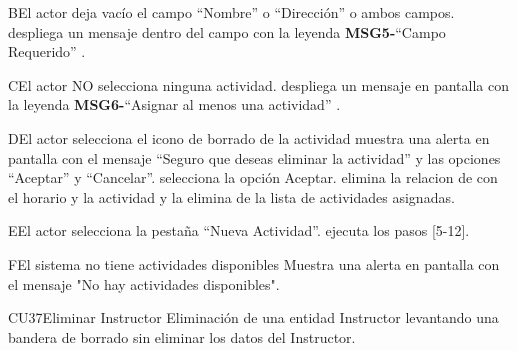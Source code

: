 		\begin{UCtrayectoriaA}{B}{El actor deja vacío el campo “Nombre” o “Dirección” o ambos campos.}
			\UCpaso despliega un mensaje dentro del campo con la leyenda {\bf MSG5-}``Campo Requerido'' .
		\end{UCtrayectoriaA}
		\begin{UCtrayectoriaA}{C}{El actor NO selecciona ninguna actividad.}
			\UCpaso despliega un mensaje en pantalla con la leyenda {\bf MSG6-}``Asignar al menos una actividad'' .
		\end{UCtrayectoriaA}
		\begin{UCtrayectoriaA}{D}{El actor selecciona el icono de borrado de la actividad }
			\UCpaso muestra una alerta en pantalla con el mensaje “Seguro que deseas eliminar la actividad” y las opciones “Aceptar” y “Cancelar”.
		    \UCpaso[\UCactor] selecciona la opción Aceptar.
		    \UCpaso elimina la relacion de con el horario y la actividad y la elimina de la lista de actividades asignadas.
		\end{UCtrayectoriaA}
		\begin{UCtrayectoriaA}{E}{El actor selecciona la pestaña “Nueva Actividad”.}
			\UCpaso ejecuta los pasos [5-12].
		\end{UCtrayectoriaA}
		\begin{UCtrayectoriaA}{F}{El sistema no tiene actividades disponibles}
			\UCpaso Muestra una alerta en pantalla con el mensaje "No hay actividades disponibles".
		\end{UCtrayectoriaA}		
\begin{UseCase}{CU37}{Eliminar Instructor}{
		Eliminación de una entidad Instructor levantando una bandera de borrado sin eliminar los datos del Instructor.
	}
\end{UseCase}
